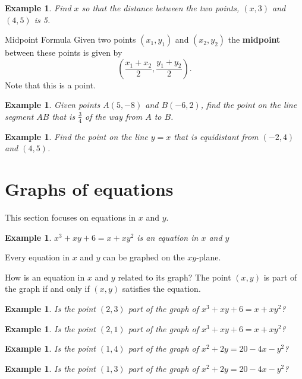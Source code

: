 \documentclass[twoside]{tufte-handout}
\newcommand{\booksection}{0}
\newcommand{\pageheader}{}
\newcounter{ekcounter}%
\theoremstyle{ekimcustom}
\newtheorem{exm}[ekcounter]{Example}
\begin{document}
\begin{exm}{Find $x$ so that the distance between the two points, $(x,3)$ and $(4,5)$ is 5.}
\end{exm}\vskip10pt

\begin{bformula}{Midpoint Formula}{}
Given two points $(x_1, y_1)$ and $(x_2,y_2)$ the {\bf{midpoint}} between these points is given by $$\left(\frac{x_1+x_2}{2}, \frac{y_1+y_2}{2}\right).$$ Note that this is a point.
\end{bformula}



\everymath{\displaystyle}
\begin{exm}{Given points $A(5,-8)$ and $B(-6, 2)$, find the point on the line segment $AB$ that is $\frac{3}{4}$ of the way from $A$ to $B$.}
\end{exm}\vskip10pt

\begin{exm}{Find the point on the line $y=x$ that is equidistant from $(-2,4)$ and $(4,5)$.}
\end{exm}\vskip10pt





\renewcommand{\booksection}{Graphs of equations}
\renewcommand{\pageheader}{\booksection }
\section*{\LARGE \pageheader}

This section focuses on equations in $x$ and $y$.
\begin{exm}
$x^3+xy+6=x+xy^2$ is an equation in $x$ and $y$
\end{exm}
Every equation in $x$ and $y$ can be graphed on the $xy$-plane.
\begin{bconcept}{How is an equation in $x$ and $y$ related to its graph?}{}
The point $(x,y)$ is part of the graph if and only if $(x,y)$ satisfies the equation.
\end{bconcept}
\begin{exm}
Is the point $(2,3)$ part of the graph of $x^3+xy+6=x+xy^2$?
\end{exm}
\vskip10pt
\begin{exm}
Is the point $(2,1)$ part of the graph of $x^3+xy+6=x+xy^2$?
\end{exm}
\vskip10pt
\begin{exm}
Is the point $(1,4)$ part of the graph of $x^2+2y=20-4x-y^2$?
\end{exm}
\vskip10pt
\begin{exm}
Is the point $(1,3)$ part of the graph of $x^2+2y=20-4x-y^2$?
\end{exm}
\vskip10pt
\end{document}
